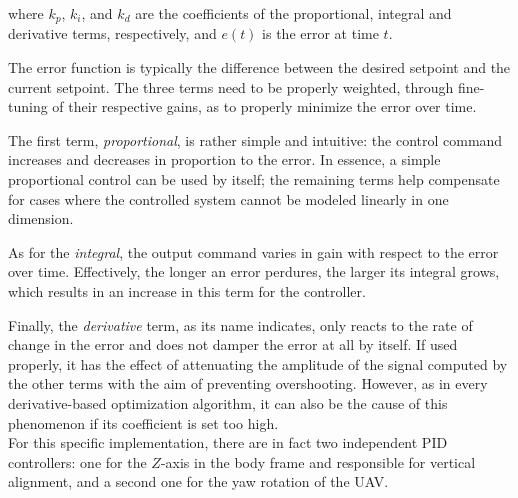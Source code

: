 where $k_p$, $k_i$, and $k_d$ are the coefficients of the proportional,
integral and derivative terms, respectively, and $e(t)$ is the error at time
$t$.

The error function is typically the difference between the desired setpoint
and the current setpoint. The three terms need to be properly weighted, through
fine-tuning of their respective gains, as to properly minimize the error
over time.

The first term, \emph{proportional}, is rather simple and intuitive: the
control command increases and decreases in proportion to the error. In essence,
a simple proportional control can be used by itself; the remaining terms help
compensate for cases where the controlled system cannot be modeled linearly
in one dimension.

As for the \emph{integral}, the output command varies in gain with respect to
the error over time. Effectively, the longer an error perdures, the larger its
integral grows, which results in an increase in this term for the controller.

Finally, the \emph{derivative} term, as its name indicates, only reacts to the
rate of change in the error and does not damper the error at all by itself.
If used properly, it has the effect of attenuating the amplitude of the signal
computed by the other terms with the aim of preventing overshooting. However,
as in every derivative-based optimization algorithm, it can also be the cause
of this phenomenon if its coefficient is set too high.\\

For this specific implementation, there are in fact two independent PID
controllers: one for the $Z$-axis in the body frame and responsible for
vertical alignment, and a second one for the yaw rotation of the UAV.
